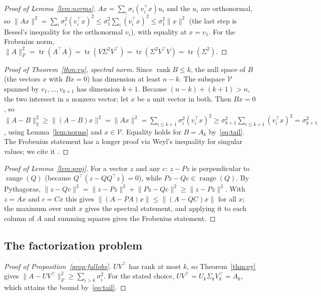 \documentclass[10pt]{article}
\theoremstyle{plain}
\theoremstyle{definition}
\theoremstyle{remark}
\newcommand{\T}{^{\top}}
\newcommand{\opn}[1]{\lVert #1\rVert_2}
\newcommand{\fro}[1]{\lVert #1\rVert_F}
\newcommand{\norm}[1]{\lVert #1\rVert}
\DeclareMathOperator{\tr}{tr}
\DeclareMathOperator{\rank}{rank}
\DeclareMathOperator{\range}{range}
\begin{document}
\begin{proof}[Proof of Lemma~\ref{lem:norms}]
$Ax=\sum_i\sigma_i(v_i\T x)u_i$ and the $u_i$ are orthonormal, so $\norm{Ax}^2=\sum_i\sigma_i^2(v_i\T x)^2\le\sigma_1^2\sum_i(v_i\T x)^2\le\sigma_1^2\norm x^2$ (the last step is Bessel's inequality for the orthonormal $v_i$), with equality at $x=v_1$. For the Frobenius norm, $\fro A^2=\tr(A\T A)=\tr(V\Sigma^2V\T)=\tr(\Sigma^2V\T V)=\tr(\Sigma^2)$.
\end{proof}

\begin{proof}[Proof of Theorem~\ref{thm:ey}, spectral norm]
Since $\rank B\le k$, the null space of $B$ (the vectors $x$ with $Bx=0$) has dimension at least $n-k$. The subspace $\mathcal V$ spanned by $v_1,\dots,v_{k+1}$ has dimension $k+1$. Because $(n-k)+(k+1)>n$, the two intersect in a nonzero vector; let $x$ be a unit vector in both. Then $Bx=0$, so
$\opn{A-B}^2\ge\norm{(A-B)x}^2=\norm{Ax}^2=\sum_{i\le k+1}\sigma_i^2(v_i\T x)^2\ge\sigma_{k+1}^2\sum_{i\le k+1}(v_i\T x)^2=\sigma_{k+1}^2$,
using Lemma~\ref{lem:norms} and $x\in\mathcal V$. Equality holds for $B=A_k$ by~\eqref{eq:tail}. The Frobenius statement has a longer proof via Weyl's inequality for singular values; we cite it \cite{eckartyoung1936,mirsky1960,golubvanloan2013}.
\end{proof}

\begin{proof}[Proof of Lemma~\ref{lem:proj}]
For a vector $z$ and any $c$: $z-Pz$ is perpendicular to $\range(Q)$ (because $Q\T(z-QQ\T z)=0$), while $Pz-Qc\in\range(Q)$. By Pythagoras, $\norm{z-Qc}^2=\norm{z-Pz}^2+\norm{Pz-Qc}^2\ge\norm{z-Pz}^2$. With $z=Ax$ and $c=Cx$ this gives $\norm{(A-PA)x}\le\norm{(A-QC)x}$ for all $x$; the maximum over unit $x$ gives the spectral statement, and applying it to each column of $A$ and summing squares gives the Frobenius statement.
\end{proof}

\subsection{The factorization problem}

\begin{proof}[Proof of Proposition~\ref{prop:fullobs}]
$UV\T$ has rank at most $k$, so Theorem~\ref{thm:ey} gives $\fro{A-UV\T}^2\ge\sum_{i>k}\sigma_i^2$. For the stated choice, $UV\T=U_k\Sigma_kV_k\T=A_k$, which attains the bound by~\eqref{eq:tail}.
\end{proof}
\end{document}

